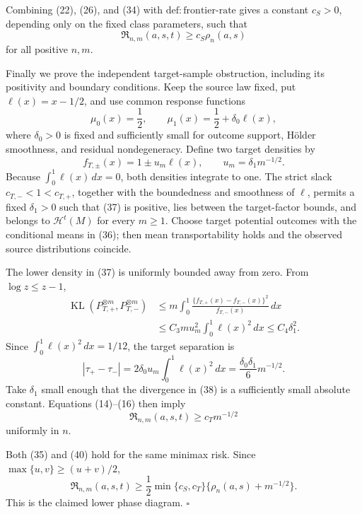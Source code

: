 Combining (22), (26), and (34) with \(\mathrm{def:frontier\text{-}rate}\) gives a constant \(c_S>0\), depending only on the fixed class parameters, such that
\[
 \mathfrak R_{n,m}(a,s,t)\geq c_S\rho_n(a,s)
 \tag{35}
\]
for all positive \(n,m\).

Finally we prove the independent target-sample obstruction, including its positivity and boundary conditions.  Keep the source law fixed, put \(\ell(x)=x-1/2\), and use common response functions
\[
 \mu_0(x)=\frac12,
 \qquad
 \mu_1(x)=\frac12+\delta_0\ell(x),
 \tag{36}
\]
where \(\delta_0>0\) is fixed and sufficiently small for outcome support, H\"older smoothness, and residual nondegeneracy.  Define two target densities by
\[
 f_{T,\pm}(x)=1\pm u_m\ell(x),
 \qquad
 u_m=\delta_1m^{-1/2}.
 \tag{37}
\]
Because \(\int_0^1\ell(x)\,dx=0\), both densities integrate to one.  The strict slack \(c_{T,-}<1<c_{T,+}\), together with the boundedness and smoothness of \(\ell\), permits a fixed \(\delta_1>0\) such that (37) is positive, lies between the target-factor bounds, and belongs to \(\mathcal H^t(M)\) for every \(m\geq1\).  Choose target potential outcomes with the conditional means in (36); then mean transportability holds and the observed source distributions coincide.

The lower density in (37) is uniformly bounded away from zero.  From \(\log z\leq z-1\),
\[
 \begin{aligned}
 \operatorname{KL}(P_{T,+}^{\otimes m},P_{T,-}^{\otimes m})
 &\leq m\int_0^1
   \frac{\{f_{T,+}(x)-f_{T,-}(x)\}^2}{f_{T,-}(x)}\,dx\\
 &\leq C_3m u_m^2\int_0^1\ell(x)^2\,dx
 \leq C_4\delta_1^2.
 \end{aligned}
 \tag{38}
\]
Since \(\int_0^1\ell(x)^2\,dx=1/12\), the target separation is
\[
 |\tau_+-\tau_-|
 =2\delta_0u_m\int_0^1\ell(x)^2\,dx
 =\frac{\delta_0\delta_1}{6}m^{-1/2}.
 \tag{39}
\]
Take \(\delta_1\) small enough that the divergence in (38) is a sufficiently small absolute constant.  Equations (14)--(16) then imply
\[
 \mathfrak R_{n,m}(a,s,t)\geq c_Tm^{-1/2}
 \tag{40}
\]
uniformly in \(n\).

Both (35) and (40) hold for the same minimax risk.  Since \(\max\{u,v\}\geq(u+v)/2\),
\[
 \mathfrak R_{n,m}(a,s,t)
 \geq \frac12\min\{c_S,c_T\}
 \{\rho_n(a,s)+m^{-1/2}\}.
\]
This is the claimed lower phase diagram. \(\square\)